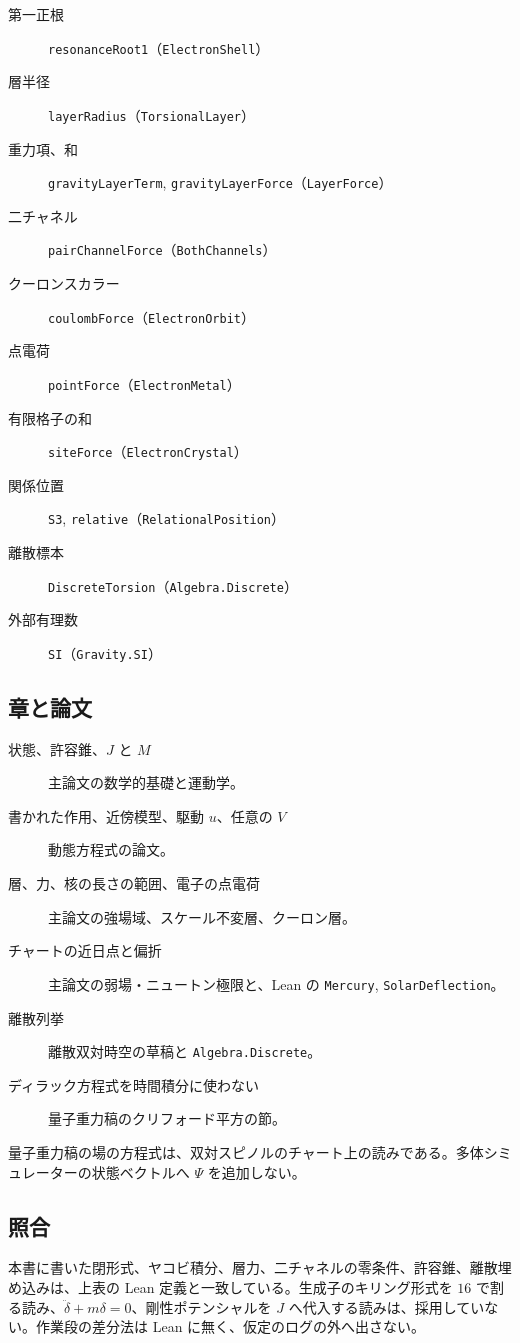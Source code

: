 \begin{description}
\item[第一正根] \texttt{resonanceRoot1}（\texttt{ElectronShell}）
\item[層半径] \texttt{layerRadius}（\texttt{TorsionalLayer}）
\item[重力項、和] \texttt{gravityLayerTerm}, \texttt{gravityLayerForce}（\texttt{LayerForce}）
\item[二チャネル] \texttt{pairChannelForce}（\texttt{BothChannels}）
\item[クーロンスカラー] \texttt{coulombForce}（\texttt{ElectronOrbit}）
\item[点電荷] \texttt{pointForce}（\texttt{ElectronMetal}）
\item[有限格子の和] \texttt{siteForce}（\texttt{ElectronCrystal}）
\item[関係位置] \texttt{S3}, \texttt{relative}（\texttt{RelationalPosition}）
\item[離散標本] \texttt{DiscreteTorsion}（\texttt{Algebra.Discrete}）
\item[外部有理数] \texttt{SI}（\texttt{Gravity.SI}）
\end{description}

\subsection{章と論文}

\begin{description}
\item[状態、許容錐、\(J\) と \(M\)] 主論文の数学的基礎と運動学。
\item[書かれた作用、近傍模型、駆動 \(u\)、任意の \(V\)] 動態方程式の論文。
\item[層、力、核の長さの範囲、電子の点電荷] 主論文の強場域、スケール不変層、クーロン層。
\item[チャートの近日点と偏折] 主論文の弱場・ニュートン極限と、Lean の \texttt{Mercury}, \texttt{SolarDeflection}。
\item[離散列挙] 離散双対時空の草稿と \texttt{Algebra.Discrete}。
\item[ディラック方程式を時間積分に使わない] 量子重力稿のクリフォード平方の節。
\end{description}

量子重力稿の場の方程式は、双対スピノルのチャート上の読みである。多体シミュレーターの状態ベクトルへ \(\Psi\) を追加しない。

\subsection{照合}

本書に書いた閉形式、ヤコビ積分、層力、二チャネルの零条件、許容錐、離散埋め込みは、上表の Lean 定義と一致している。生成子のキリング形式を \(16\) で割る読み、\(\ddot\delta+m\delta=0\)、剛性ポテンシャルを \(J\) へ代入する読みは、採用していない。作業段の差分法は Lean に無く、仮定のログの外へ出さない。
